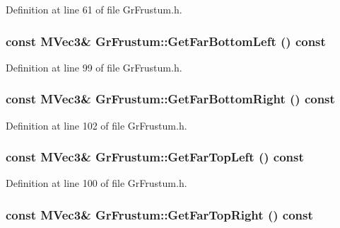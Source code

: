 \begin{CompactItemize}
Definition at line 61 of file GrFrustum.h.\hypertarget{class_gr_frustum_397c8f3652cf399e6fd086fcf4e679fd}{
\subsubsection[{GetFarBottomLeft}]{\setlength{\rightskip}{0pt plus 5cm}const {\bf MVec3}\& GrFrustum::GetFarBottomLeft () const}}
\label{class_gr_frustum_397c8f3652cf399e6fd086fcf4e679fd}




Definition at line 99 of file GrFrustum.h.\hypertarget{class_gr_frustum_5aab839f4efc785026daf9c7c53284a0}{
\subsubsection[{GetFarBottomRight}]{\setlength{\rightskip}{0pt plus 5cm}const {\bf MVec3}\& GrFrustum::GetFarBottomRight () const}}
\label{class_gr_frustum_5aab839f4efc785026daf9c7c53284a0}




Definition at line 102 of file GrFrustum.h.\hypertarget{class_gr_frustum_5cf3f35a1eddcde0f8f5386ed40c641f}{
\subsubsection[{GetFarTopLeft}]{\setlength{\rightskip}{0pt plus 5cm}const {\bf MVec3}\& GrFrustum::GetFarTopLeft () const}}
\label{class_gr_frustum_5cf3f35a1eddcde0f8f5386ed40c641f}




Definition at line 100 of file GrFrustum.h.\hypertarget{class_gr_frustum_6501233fcb7db5d06b3ec22befa4fbdb}{
\subsubsection[{GetFarTopRight}]{\setlength{\rightskip}{0pt plus 5cm}const {\bf MVec3}\& GrFrustum::GetFarTopRight () const}}
\label{class_gr_frustum_6501233fcb7db5d06b3ec22befa4fbdb}





\end{CompactItemize}
